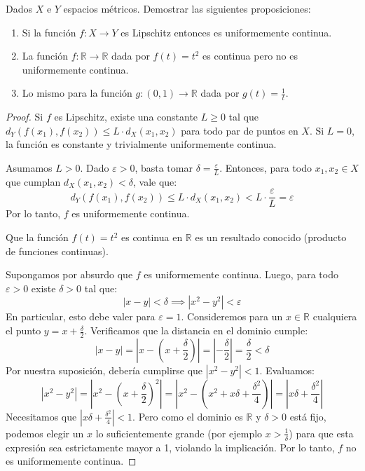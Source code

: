 \documentclass{article}
\theoremstyle{plain}
\theoremstyle{definition}
\newenvironment{ejercicio}[1]{\begin{trivlist}
\item[\hskip \labelsep {\bfseries Ejercicio}\hskip \labelsep {\bfseries #1.}]}{\end{trivlist}}
\begin{document}
\begin{ejercicio}{9}
    Dados \( X \) e \( Y \) espacios métricos. Demostrar las siguientes proposiciones:
    \begin{enumerate}
        \item[(a)] Si la función \( f : X \to Y \) es Lipschitz entonces es uniformemente continua.
        \item[(b)] La función \( f : \mathbb{R} \to \mathbb{R} \) dada por \( f(t) = t^{2} \) es continua pero no es uniformemente continua.
        \item[(c)] Lo mismo para la función \( g : (0, 1) \to \mathbb{R} \) dada por \( g(t) = \frac{1}{t} \).
    \end{enumerate}
\end{ejercicio}
\begin{proof}
    Si \( f \) es Lipschitz, existe una constante \( L \ge 0 \) tal que \( d_Y(f(x_1), f(x_2)) \leq L \cdot d_X(x_1, x_2) \) para todo par de puntos en \( X \). Si \( L = 0 \), la función es constante y trivialmente uniformemente continua.

    Asumamos \( L > 0 \). Dado \( \varepsilon > 0 \), basta tomar \( \delta = \frac{\varepsilon}{L} \). Entonces, para todo \( x_1, x_2 \in X \) que cumplan \( d_X(x_1, x_2) < \delta \), vale que:
    \[
        d_Y(f(x_1), f(x_2)) \leq L \cdot d_X(x_1, x_2) < L \cdot \frac{\varepsilon}{L} = \varepsilon
    \]
    Por lo tanto, \( f \) es uniformemente continua.

    \vspace{0.3cm}
    Que la función \( f(t) = t^2 \) es continua en \( \mathbb{R} \) es un resultado conocido (producto de funciones continuas).

    Supongamos por absurdo que \( f \) es uniformemente continua. Luego, para todo \( \varepsilon > 0 \) existe \( \delta > 0 \) tal que:
    \[
        | x - y | < \delta \implies |x^2 - y^2| < \varepsilon
    \]
    En particular, esto debe valer para \( \varepsilon = 1 \). Consideremos para un \( x \in \mathbb{R} \) cualquiera el punto \( y = x + \frac{\delta}{2} \). Verificamos que la distancia en el dominio cumple:
    \[
        |x - y| = \left| x - \left( x + \frac{\delta}{2} \right) \right| = \left| -\frac{\delta}{2} \right| = \frac{\delta}{2} < \delta
    \]
    Por nuestra suposición, debería cumplirse que \( |x^2 - y^2| < 1 \). Evaluamos:
    \[
        |x^2 - y^2| = \left| x^2 - {\left(x+\frac{\delta}{2}\right)}^2 \right| = \left| x^2 - \left( x^2 + x\delta + \frac{\delta^2}{4} \right) \right| = \left| x\delta + \frac{\delta^2}{4} \right|
    \]
    Necesitamos que \( \left| x\delta + \frac{\delta^2}{4} \right| < 1 \). Pero como el dominio es \( \mathbb{R} \) y \( \delta > 0 \) está fijo, podemos elegir un \( x \) lo suficientemente grande (por ejemplo \( x > \frac{1}{\delta} \)) para que esta expresión sea estrictamente mayor a 1, violando la implicación. Por lo tanto, \( f \) no es uniformemente continua.


\end{proof}
\end{document}
